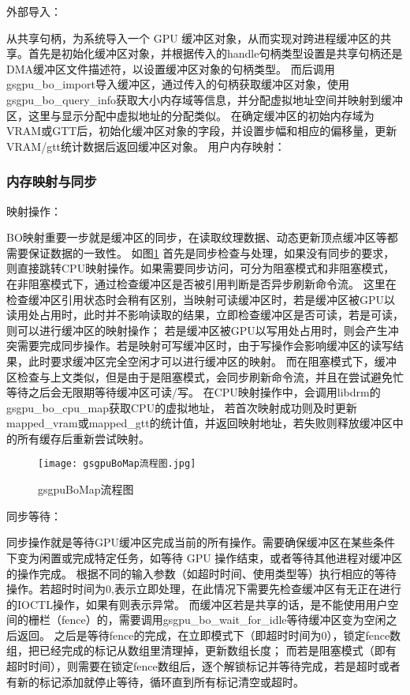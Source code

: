 外部导入：

从共享句柄，为系统导入一个 GPU 缓冲区对象，从而实现对跨进程缓冲区的共享。首先是初始化缓冲区对象，并根据传入的handle句柄类型设置是共享句柄还是DMA缓冲区文件描述符，以设置缓冲区对象的句柄类型。
而后调用gsgpu\_bo\_import导入缓冲区，通过传入的句柄获取缓冲区对象，使用gsgpu\_bo\_query\_info获取大小内存域等信息，并分配虚拟地址空间并映射到缓冲区，这里与显示分配中虚拟地址的分配类似。
在确定缓冲区的初始内存域为VRAM或GTT后，初始化缓冲区对象的字段，并设置步幅和相应的偏移量，更新VRAM/gtt统计数据后返回缓冲区对象。
用户内存映射：

\subsubsection{内存映射与同步}

映射操作：

BO映射重要一步就是缓冲区的同步，在读取纹理数据、动态更新顶点缓冲区等都需要保证数据的一致性。
如图\ref{fig:gsgpuBoMap流程图}
首先是同步检查与处理，如果没有同步的要求，则直接跳转CPU映射操作。如果需要同步访问，可分为阻塞模式和非阻塞模式，在非阻塞模式下，通过检查缓冲区是否被引用判断是否异步刷新命令流。
这里在检查缓冲区引用状态时会稍有区别，当映射可读缓冲区时，若是缓冲区被GPU以读用处占用时，此时并不影响读取的结果，立即检查缓冲区是否可读，若是可读，则可以进行缓冲区的映射操作；
若是缓冲区被GPU以写用处占用时，则会产生冲突需要完成同步操作。若是映射可写缓冲区时，由于写操作会影响缓冲区的读写结果，此时要求缓冲区完全空闲才可以进行缓冲区的映射。
而在阻塞模式下，缓冲区检查与上文类似，但是由于是阻塞模式，会同步刷新命令流，并且在尝试避免忙等待之后会无限期等待缓冲区可读/写。
在CPU映射操作中，会调用libdrm的gsgpu\_bo\_cpu\_map获取CPU的虚拟地址，
若首次映射成功则及时更新mapped\_vram或mapped\_gtt的统计值，并返回映射地址，若失败则释放缓冲区中的所有缓存后重新尝试映射。

\begin{figure}[h]
  \centering
  \texttt{[image: gsgpuBoMap流程图.jpg]}
  \caption{gsgpuBoMap流程图}
  \label{fig:gsgpuBoMap流程图}
\end{figure}

同步等待：

同步操作就是等待GPU缓冲区完成当前的所有操作。需要确保缓冲区在某些条件下变为闲置或完成特定任务，如等待 GPU 操作结束，或者等待其他进程对缓冲区的操作完成。
根据不同的输入参数（如超时时间、使用类型等）执行相应的等待操作。若超时时间为0,表示立即处理，在此情况下需要先检查缓冲区有无正在进行的IOCTL操作，如果有则表示异常。
而缓冲区若是共享的话，是不能使用用户空间的栅栏（fence）的，需要调用gsgpu\_bo\_wait\_for\_idle等待缓冲区变为空闲之后返回。
之后是等待fence的完成，在立即模式下（即超时时间为0），锁定fence数组，把已经完成的标记从数组里清理掉，更新数组长度；
而若是阻塞模式（即有超时时间），则需要在锁定fence数组后，逐个解锁标记并等待完成，若是超时或者有新的标记添加就停止等待，循环直到所有标记清空或超时。

